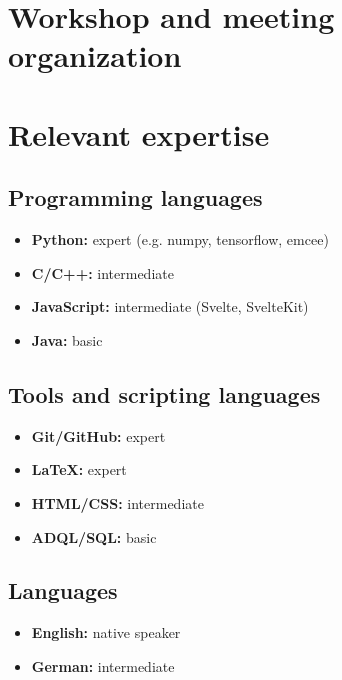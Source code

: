 \documentclass[12pt, letterpaper]{hunt-cv}
\begin{document}
\section*{Workshop and meeting organization}


\section*{Relevant expertise}

\subsection*{Programming languages}

\begin{itemize}
    \item \textbf{Python:} expert (e.g. numpy, tensorflow, emcee)
    \item \textbf{C/C++:} intermediate
    \item \textbf{JavaScript:} intermediate (Svelte, SvelteKit)
    \item \textbf{Java:} basic
\end{itemize}

\subsection*{Tools and scripting languages}

\begin{itemize}
    \item \textbf{Git/GitHub:} expert
    \item \textbf{LaTeX:} expert
    \item \textbf{HTML/CSS:} intermediate
    \item \textbf{ADQL/SQL:} basic
\end{itemize}

\subsection*{Languages}

\begin{itemize}
    \item \textbf{English:} native speaker
    \item \textbf{German:} intermediate
\end{itemize}
\end{document}
